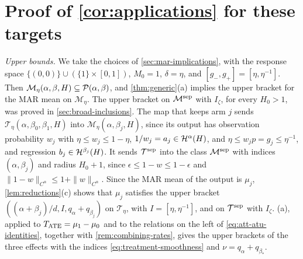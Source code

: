 \section{Proof of \texorpdfstring{\cref{cor:applications}}{the corollary} for these targets}\label{sec:broad-lower}

\emph{Upper bounds.} We take the choices of
\cref{sec:mar-implications}, with the response space
$\{(0,0)\}\cup(\{1\}\times[0,1])$, $M_0=1$, $\delta=\eta$, and
$[g_-,g_+]=[\eta,\eta^{-1}]$. Then
$\mathcal M_\eta(\alpha,\beta,H)\subseteq\mathcal P(\alpha,\beta)$, and
\cref{thm:generic}(a) implies the upper bracket for the MAR mean
on $\mathcal M_\eta$. The upper bracket on $\mathcal M^{\rm sep}$ with
$I_\zeta$, for every $H_0>1$, was proved in
\cref{sec:broad-inclusions}.
The map that keeps arm $j$ sends
$\mathcal T_\eta(\alpha,\beta_0,\beta_1,H)$ into
$\mathcal M_\eta(\alpha,\beta_j,H)$, since its output has observation
probability $w_j$ with $\eta\le w_j\le1-\eta$,
$1/w_j=a_j\in\mathcal H^\alpha(H)$, and $\eta\le w_jp=g_j\le\eta^{-1}$, and
regression $b_j\in\mathcal H^{\beta_j}(H)$. It sends $\mathcal T^{\rm sep}$
into the class $\mathcal M^{\rm sep}$ with indices $(\alpha,\beta_j)$
and radius $H_0+1$, since $\epsilon\le1-w\le1-\epsilon$ and
$\|1-w\|_{C^\alpha}\le1+\|w\|_{C^\alpha}$. Since the MAR mean of the
output is $\mu_j$, \cref{lem:reductions}(c) shows that $\mu_j$
satisfies the upper bracket $((\alpha+\beta_j)/d,I,q_\alpha+q_{\beta_j})$
on $\mathcal T_\eta$, with $I=[\eta,\eta^{-1}]$, and on
$\mathcal T^{\rm sep}$ with $I_\zeta$. (a),
applied to $T_{\rm ATE}=\mu_1-\mu_0$ and to the relations on the left
of \eqref{eq:att-atu-identities}, together with
\cref{rem:combining-rates}, gives the upper brackets of the
three effects with the indices \eqref{eq:treatment-smoothness} and
$\nu=q_\alpha+q_{\beta_*}$.

